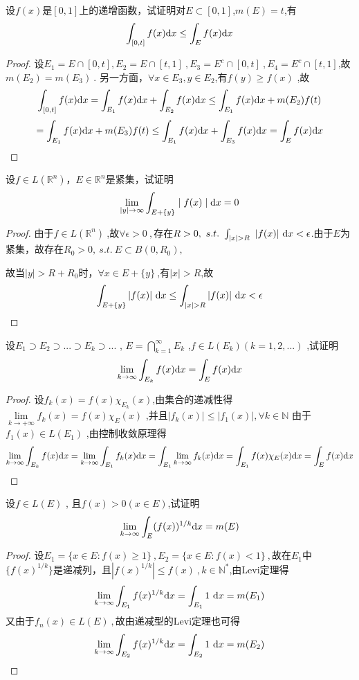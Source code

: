 设$f(x)$是$[0,1]$上的递增函数，试证明对$E \subset [0,1]$,$m(E)=t$,有$$\int_{[0,t]} f(x) \mathrm{d}x \leq \int_E f(x) \mathrm{d}x$$
\begin{proof}
设$E_1=E\cap[0,t], E_2=E\cap[t,1]\ ,E_3=E^c\cap[0,t]\ ,E_4=E^c\cap[t,1]$,故$m(E_2)=m(E_3)\ $.
另一方面，$\forall x\in E_3,y\in E_2$,有$f(y)\geq f(x)$
,故$$\int_{[0,t]}f(x)\mathrm{d}x=\int_{E_1}f(x)\mathrm{d}x+\int_{E_2}f(x)\mathrm{d}x\leq\int_{E_1}f(x)\mathrm{d}x+m(E_2)f(t)$$$$=\int_{E_1}f(x)\mathrm{d}x+m(E_3)f(t)\leq \int_{E_1}f(x)\mathrm{d}x+\int_{E_3}f(x)\mathrm{d}x=\int_{E}f(x)\mathrm{d}x$$
\end{proof}


设$f\in L(\mathbb{R}^n)$，$E\in \mathbb{R}^n$是紧集，试证明$$\lim\limits_{\mid y \mid \to \infty} \int_{E+\{y\}} \mid f(x) \mid \mathrm{d}x=0$$
\begin{proof}
由于$f\in L(\mathbb{R}^n) \ $,故$\forall \epsilon>0\ ,$存在$R>0,\ s.t.\ \int_{|x|>R}\ |f(x)|\ \di{x}<\epsilon$.由于$E$为紧集，故存在$R_0>0,\ s.t. \ E\subset B(0,R_0),$\par 故当$|y|>R+R_0$时，$\forall x\in E+\{y\}\ $,有$|x|>R$,故$$\int_{E+\{y\}}|f(x)|
\ \di{x\leq\int_{|x|>R}}|f(x)|\ \di{x<\epsilon}$$
\end{proof}


设$E_1 \supset E_2 \supset...\supset E_k \supset... $ , $ E=\bigcap_{k=1}^{\infty}{E_k} $ ,$ f\in L(E_k)(k=1,2,...) $ ,试证明$$\lim\limits_{k \to \infty}\int_{E_k} f(x) \mathrm{d}x=\int_E f(x) \mathrm{d}x$$
\begin{proof}
设$f_k(x)=f(x)\chi_{E_k}(x)$,由集合的递减性得$\lim\limits_{k \to +\infty}f_k(x)=f(x)\chi_E(x) $ ,并且$\mid f_k(x)\mid \leq  \mid f_1(x)\mid ,\forall k \in \mathbb{N}$ 由于$f_1(x)\in L(E_1) $ ,由控制收敛原理得$$\lim\limits_{k \to \infty} \int_{E_k} f(x) \mathrm{d}x=\lim\limits_{k \to \infty} \int_{E_1} f_k(x) \mathrm{d}x= \int_{E_1} \lim\limits_{k \to \infty}f_k(x) \mathrm{d}x=\int_{E_1} f(x)\chi_E(x) \mathrm{d}x=\int_{E} f(x) \mathrm{d}x $$
\end{proof}


设$f\in L(E)$ , 且$f(x)>0(x \in E)$,试证明$$\lim\limits_{k \to \infty}\int_{E} (f(x))^{1/k} \mathrm{d}x=m(E)$$
\begin{proof}
设$E_1=\{x\in E:f(x)\geq1\}\ ,E_2=\{x\in E:f(x)<1\}\ ,$故在$E_1$中$\{f(x)^{1/k}\}$是递减列，且$|f(x)^{1/k}|\leq f(x)\ ,k \in \mathbb{N}^*$,由Levi定理得$$\lim\limits_{k\to\infty}\int_{E_1}f(x)^{1/k}\mathrm{d}x= \int_{E_1}1\ \mathrm{d}x=m(E_1)$$
又由于$f_n(x)\in L(E)\ ,$故由递减型的Levi定理也可得$$\lim\limits_{k\to\infty}\int_{E_2}f(x)^{1/k}\mathrm{d}x= \int_{E_2}1\ \mathrm{d}x=m(E_2)$$
\end{proof}

